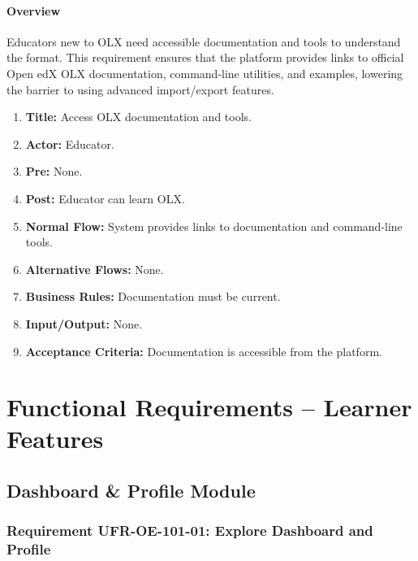 \paragraph{Overview}
Educators new to OLX need accessible documentation and tools to understand the format. This requirement ensures that the platform provides links to official Open edX OLX documentation, command‑line utilities, and examples, lowering the barrier to using advanced import/export features.
\begin{enumerate}[label=\textbf{\arabic*.}]
\item \textbf{Title:} Access OLX documentation and tools.
\item \textbf{Actor:} Educator.
\item \textbf{Pre:} None.
\item \textbf{Post:} Educator can learn OLX.
\item \textbf{Normal Flow:} System provides links to documentation and command-line tools.
\item \textbf{Alternative Flows:} None.
\item \textbf{Business Rules:} Documentation must be current.
\item \textbf{Input/Output:} None.
\item \textbf{Acceptance Criteria:} Documentation is accessible from the platform.
\end{enumerate}

\section{Functional Requirements – Learner Features}

\subsection{Dashboard \& Profile Module}
\subsubsection{Requirement UFR-OE-101-01: Explore Dashboard and Profile}
